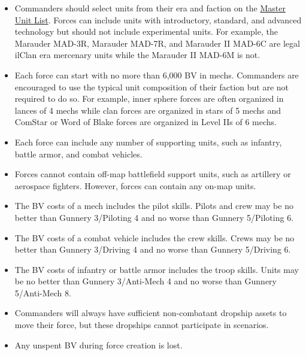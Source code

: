 \documentclass[UTF8]{article}
\begin{document}
\begin{itemize}

\item Commanders should select units from their era and faction on the \href{http://www.masterunitlist.info/}{Master Unit List}.
Forces can include units with introductory, standard, and advanced technology but should not include experimental units.
For example, the Marauder MAD-3R, Marauder MAD-7R, and Marauder II MAD-6C are legal ilClan era mercenary units while the Marauder II MAD-6M is not.

\item Each force can start with no more than 6,000 BV in mechs.
Commanders are encouraged to use the typical unit composition of their faction but are not required to do so.
For example, inner sphere forces are often organized in lances of 4 mechs while clan forces are organized in stars of 5 mechs and ComStar or Word of Blake forces are organized in Level IIs of 6 mechs.

\item Each force can include any number of supporting units, such as infantry, battle armor, and combat vehicles.

\item Forces cannot contain off-map battlefield support units, such as artillery or aerospace fighters.
However, forces can contain any on-map units.

\item The BV costs of a mech includes the pilot skills.
Pilots and crew may be no better than Gunnery 3/Piloting 4 and no worse than Gunnery 5/Piloting 6.

\item The BV costs of a combat vehicle includes the crew skills.
Crews may be no better than Gunnery 3/Driving 4 and no worse than Gunnery 5/Driving 6.

\item The BV costs of infantry or battle armor includes the troop skills.
Units may be no better than Gunnery 3/Anti-Mech 4 and no worse than Gunnery 5/Anti-Mech 8.

\item Commanders will always have sufficient non-combatant dropship assets to move their force, but these dropships cannot participate in scenarios.

\item Any unspent BV during force creation is lost.

\end{itemize}
\end{document}
